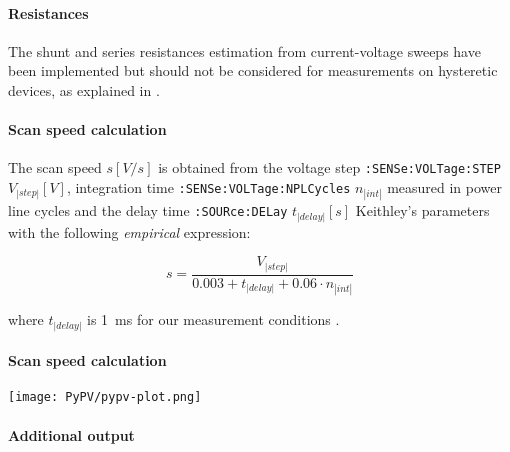 		\paragraph{Resistances} The shunt and series resistances estimation from current-voltage sweeps have been implemented but should not be considered for measurements on hysteretic devices, as explained in .

		\paragraph{Scan speed calculation}
		The scan speed $s[V/s]$ is obtained from the voltage step \texttt{:SENSe:VOLTage:STEP} $V_|step|[V]$, integration time \texttt{:SENSe:VOLTage:NPLCycles} $n_|int|$ measured in power line cycles and the delay time \texttt{:SOURce:DELay} $t_|delay|[s]$ Keithley's parameters with the following \textit{empirical} expression:

		\begin{equation}
			s = \frac{V_|step|}{0.003 + t_|delay| + 0.06 \cdot n_|int|}
		\end{equation}

		where $t_|delay|$ is \SI{1}{\ms} for our measurement conditions \cite{KeithleyInstruments2011}.

		\paragraph{Scan speed calculation}

\begin{SCfigure}
	\centering
	\texttt{[image: PyPV/pypv-plot.png]}
	\mycaption[]{}\label{fig:pypv-plot}
\end{SCfigure}

\paragraph{Additional output}

\begin{figure}
\end{figure}

